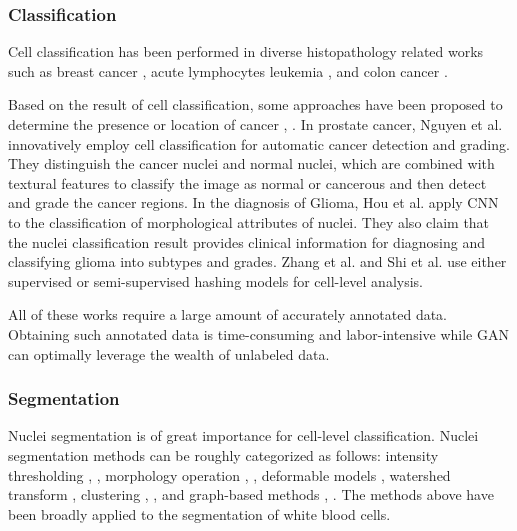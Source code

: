 \documentclass[journal]{IEEEtran}
\begin{document}
\subsubsection{Classification}

Cell classification has been performed in diverse histopathology related works such as breast cancer \cite{Malon2013Classification}, acute lymphocytes leukemia \cite{Mohapatra2014An,Zhao2016Automatic}, and colon cancer \cite{Sirinukunwattana2016Locality}.

Based on the result of cell classification, some approaches have been proposed to determine the presence or location of cancer \cite{Nguyen2011Prostate}, \cite{hou2016automatic}. In prostate cancer, Nguyen et al. \cite{Nguyen2011Prostate} innovatively employ cell classification for automatic cancer detection and grading. They distinguish the cancer nuclei and normal nuclei, which are combined with textural features to classify the image as normal or cancerous and then detect and grade the cancer regions. In the diagnosis of Glioma, Hou et al. \cite{hou2016automatic} apply CNN to the classification of morphological attributes of nuclei. They also claim that the nuclei classification result provides clinical information for diagnosing and classifying glioma into subtypes and grades. {Zhang et al. \cite{zhang2015weighted, zhang2015towards, zhang2015high} and Shi et al. \cite{shi2017cell} use either supervised or semi-supervised hashing models for cell-level analysis.}

All of these works require a large amount of accurately annotated data. Obtaining such annotated data is time-consuming and labor-intensive while GAN can optimally leverage the wealth of unlabeled data.

\subsubsection{Segmentation}
Nuclei segmentation is of great importance for cell-level classification. Nuclei segmentation methods can be roughly categorized as follows: intensity thresholding \cite{Callau2015Evaluation}, \cite{Wienert2012Detection}, morphology operation \cite{Dorini2013Semiautomatic}, \cite{Schmitt2009Morphological}, deformable models \cite{Dzyubachyk2010Advanced}, watershed transform \cite{Long2009A}, clustering \cite{Hai2014Automatic}, \cite{Bueno2012A}, and graph-based methods \cite{Chang2013Invariant}, \cite{Arslan2013Attributed}. The methods above have been broadly applied to the segmentation of white blood cells.
\end{document}
